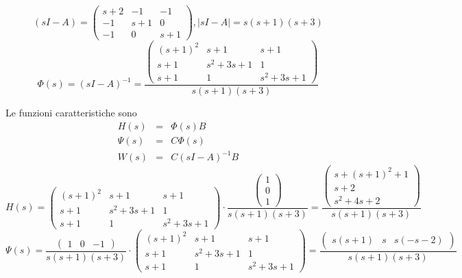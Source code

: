 \documentclass{article}
\begin{document}
\[ (sI-A) = \left(\begin{matrix}s + 2 & -1 & -1\\-1 & s + 1 & 0\\-1 & 0 & s + 1\end{matrix}\right), |sI-A| = s \left(s + 1\right) \left(s + 3\right) \]
\[ \Phi(s) = (sI-A)^{-1} = \frac{\left(\begin{matrix}\left(s + 1\right)^{2} & s + 1 & s + 1\\s + 1 & s^{2} + 3 s + 1 & 1\\s + 1 & 1 & s^{2} + 3 s + 1\end{matrix}\right)}{s \left(s + 1\right) \left(s + 3\right)} \]

Le funzioni caratteristiche sono \[\begin{array}{rcl}  H(s) & = & \Phi(s)B \\ \Psi(s) & = & C \Phi(s)\\ W(s) & = & C(sI-A)^{-1}B  \end{array} \]
\[ H(s) = \left(\begin{matrix}\left(s + 1\right)^{2} & s + 1 & s + 1\\s + 1 & s^{2} + 3 s + 1 & 1\\s + 1 & 1 & s^{2} + 3 s + 1\end{matrix}\right)\cdot \frac{\left(\begin{matrix}1\\0\\1\end{matrix}\right)}{s \left(s + 1\right) \left(s + 3\right)} = \frac{\left(\begin{matrix}s + \left(s + 1\right)^{2} + 1\\s + 2\\s^{2} + 4 s + 2\end{matrix}\right)}{s \left(s + 1\right) \left(s + 3\right)} \]\[ \Psi(s) = \frac{\left(\begin{matrix}1 & 0 & -1\end{matrix}\right)}{s \left(s + 1\right) \left(s + 3\right)}\cdot\left(\begin{matrix}\left(s + 1\right)^{2} & s + 1 & s + 1\\s + 1 & s^{2} + 3 s + 1 & 1\\s + 1 & 1 & s^{2} + 3 s + 1\end{matrix}\right)  = \frac{\left(\begin{matrix}s \left(s + 1\right) & s & s \left(- s - 2\right)\end{matrix}\right)}{s \left(s + 1\right) \left(s + 3\right)} \]
\end{document}
